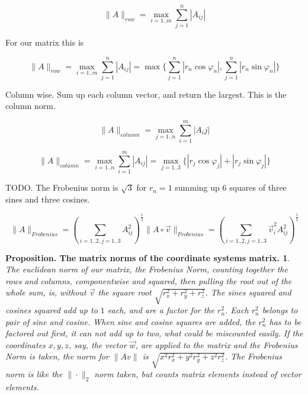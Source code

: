 \documentclass[a4paper]{article}
\begin{document}
\begin{Example}
\begin{displaymath}
\|A\|_{row} = \max_{i=1..m} { \sum_{j=1}^{n} |A_{ij}| }
\end{displaymath}

For our matrix this is

\begin{displaymath}
\|A\|_{row} = \max_{i=1..m} { \sum_{j=1}^{n} |A_{ij}| } = \max\{ \sum_{j=1}^{n} |r_n\cos\varphi_n|, \sum_{j=1}^{n} |r_n\sin\varphi_n| \}
\end{displaymath}


Column wise. Sum up each column vector, and return the largest. This is the column norm.

\begin{displaymath}
\|A\|_{column} = \max_{j=1..n} { \sum_{i=1}^{m} |A_{i}j| }
\end{displaymath}

\begin{displaymath}
\|A\|_{column} = \max_{i=1..n} { \sum_{i=1}^{m} |A_{ij}| } = \max_{j=1..3}\{ |r_j\cos\varphi_j| + |r_j\sin\varphi_j| \}
\end{displaymath}

TODO. The Frobenius norm is $\sqrt{3}$ for $r_n = 1$ summing up 6 squares of three sines and three cosines.

\begin{displaymath}
\|A\|_{Frobenius} = (\sum_{i=1..2,j=1..3}A_{ij}^{2})^{\frac12}
\|A\circ\vec{v}\|_{Frobenius} = (\sum_{i=1..2,j=1..3}\vec{v}_{i}^{2}A_{ij}^{2})^{\frac12}
\end{displaymath}


\newtheorem{PropositionMatrixNorm}{Proposition. The matrix norms of the coordinate systems matrix.}
\begin{PropositionMatrixNorm}
\label{proposition_matrix_norm}
The euclidean norm of our matrix, the Frobenius Norm, counting together the rows and columns, componentwise and squared, then pulling the root out of the whole sum, is, without $\vec{v}$ the square root $\sqrt{r_{x}^{2}+r_{y}^{2}+r_{z}^{2}}$. The sines squared and cosines squared add up to $1$ each, and are a factor for the $r_{n}^{2}$. Each $r_{n}^{2}$ belongs to pair of sine and cosine. When sine and cosine squares are added, the $r_{n}^{2}$ has to be factored out first, it can not add up to two, what could be miscounted easily. If the coordinates $x,y,z$, say, the vector $\vec{w}$, are applied to the matrix and the Frobenius Norm is taken, the norm for $\|Av\|$ is $\sqrt{x^{2}r_{x}^{2}+y^{2}r_{y}^{2}+z^{2}r_{z}^{2}}$. The Frobenius norm is like the $\|\cdot\|_{2}$ norm taken, but counts matrix elements instead of vector elements.\\


\end{PropositionMatrixNorm}
\end{Example}
\end{document}
